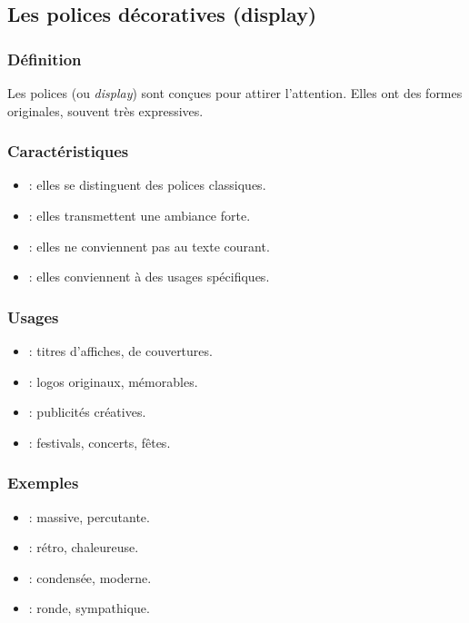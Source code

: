 \subsection{Les polices décoratives (display)}

\subsubsection{Définition}

Les polices  (ou \emph{display}) sont conçues pour attirer l'attention. Elles ont des formes originales, souvent très expressives.

\subsubsection{Caractéristiques}

\begin{itemize}
    \item {} : elles se distinguent des polices classiques.
    \item {} : elles transmettent une ambiance forte.
    \item {} : elles ne conviennent pas au texte courant.
    \item {} : elles conviennent à des usages spécifiques.
\end{itemize}

\subsubsection{Usages}

\begin{itemize}
    \item {} : titres d'affiches, de couvertures.
    \item {} : logos originaux, mémorables.
    \item {} : publicités créatives.
    \item {} : festivals, concerts, fêtes.
\end{itemize}

\subsubsection{Exemples}

\begin{itemize}
    \item {} : massive, percutante.
    \item {} : rétro, chaleureuse.
    \item {} : condensée, moderne.
    \item {} : ronde, sympathique.
\end{itemize}

